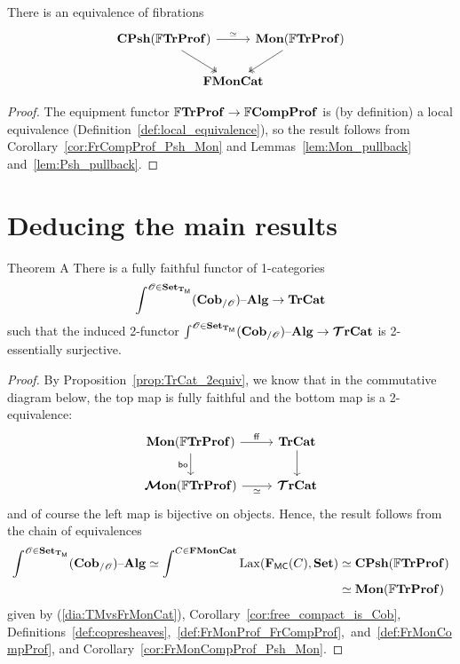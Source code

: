 \documentclass[12pt,oneside,article,draft]{memoir}
\begin{document}
\begin{corollary}\label{cor:FrMonCompProf_Psh_Mon}
   There is an equivalence of fibrations
   \begin{equation*}
      \begin{tikzcd}[column sep=-1.5em]
         \CPsh(\dFrTrProf) \ar[rr,"\equiv"] \ar[dr,two heads]
            && \Mon(\dFrTrProf) \ar[dl,two heads] \\
            & \FrMonCat &
      \end{tikzcd}
   \end{equation*}
\end{corollary}
\begin{proof}
   The equipment functor $\mathbb{F}\mathbf{TrProf}\to\mathbb{F}\mathbf{CompProf}$ is (by definition) a local equivalence
   (Definition~\ref{def:local_equivalence}), so the result follows from
   Corollary~\ref{cor:FrCompProf_Psh_Mon} and Lemmas~\ref{lem:Mon_pullback}~ and~\ref{lem:Psh_pullback}.
\end{proof}

\section{Deducing the main results}\label{sec:deducing}

\begin{named}{Theorem A}
  There is a fully faithful functor of 1-categories
   \begin{equation*}
      \int^{\mathscr{O}\in\mathbf{Set}_{\mathbf{T}_{\mathsf{M}}}}(\mathbf{Cob}_{/\mathscr{O}}){\text \textendash}\mathbf{Alg} \to \mathbf{TrCat}
   \end{equation*}
   such that the induced 2-functor $\int^{\mathscr{O}\in\mathbf{Set}_{\mathbf{T}_{\mathsf{M}}}}(\mathbf{Cob}_{/\mathscr{O}}){\text \textendash}\mathbf{Alg}\to\bm{\mathcal{T}}\mathbf{rCat}$ is 2-essentially surjective.
\end{named}

\begin{proof}

By Proposition~\ref{prop:TrCat_2equiv}, we know that in the commutative diagram below, the top map is fully faithful and the bottom map is a 2-equivalence:
\begin{equation*}
	\begin{tikzcd}
		\Mon(\dFrTrProf)\ar[r,"\ff"]\ar[d,"\bo"']&\TrCat\ar[d]\\
		\MMon(\dFrTrProf)\ar[r,"\equiv"']&\TTrCat
	\end{tikzcd}
\end{equation*}
and of course the left map is bijective on objects. Hence, the result follows from the chain of equivalences
\begin{align*}
\int^{\mathscr{O}\in\mathbf{Set}_{\mathbf{T}_{\mathsf{M}}}}(\mathbf{Cob}_{/\mathscr{O}}){\text \textendash}\mathbf{Alg}\simeq\int^{C\in\mathbf{FMonCat}}\operatorname{Lax}(\mathbf{F}_{\mathsf{MC}}(C),\mathbf{Set})
&\simeq\mathbf{CPsh}(\mathbb{F}\mathbf{TrProf})\\
&\simeq\mathbf{Mon}(\mathbb{F}\mathbf{TrProf})
\end{align*}
given by (\ref{dia:TMvsFrMonCat}), Corollary~\ref{cor:free_compact_is_Cob}, Definitions~\ref{def:copresheaves},~\ref{def:FrMonProf_FrCompProf},~and~\ref{def:FrMonCompProf}, and Corollary~\ref{cor:FrMonCompProf_Psh_Mon}.
\end{proof}
\end{document}
